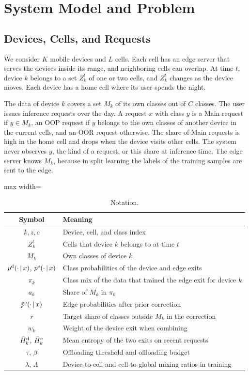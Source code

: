 \section{System Model and Problem}
\label{sec:system}

\subsection{Devices, Cells, and Requests}

We consider $K$ mobile devices and $L$ cells. Each cell has an edge server that serves the devices inside its range, and neighboring cells can overlap. At time $t$, device $k$ belongs to a set $Z_k^t$ of one or two cells, and $Z_k^t$ changes as the device moves. Each device has a home cell where its user spends the night.

The data of device $k$ covers a set $M_k$ of its own classes out of $C$ classes. The user issues inference requests over the day. A request $x$ with class $y$ is a Main request if $y\in M_k$, an OOP request if $y$ belongs to the own classes of another device in the current cells, and an OOR request otherwise. The share of Main requests is high in the home cell and drops when the device visits other cells. The system never observes $y$, the kind of a request, or this share at inference time. The edge server knows $M_k$, because in split learning the labels of the training samples are sent to the edge.

\begin{table}[t]
\centering
\caption{Notation.}
\label{tab:notation}
\begin{adjustbox}{max width=\columnwidth}
\begin{tabular}{cl}
\toprule
Symbol & Meaning \\
\midrule
$k, z, c$ & Device, cell, and class index \\
$Z_k^t$ & Cells that device $k$ belongs to at time $t$ \\
$M_k$ & Own classes of device $k$ \\
$p^{\mathrm{d}}(\cdot\,|\,x)$, $p^{\mathrm{e}}(\cdot\,|\,x)$ & Class probabilities of the device and edge exits \\
$\pi_k$ & Class mix of the data that trained the edge exit for device $k$ \\
$a_k$ & Share of $M_k$ in $\pi_k$ \\
$\tilde p^{\mathrm{e}}(\cdot\,|\,x)$ & Edge probabilities after prior correction \\
$r$ & Target share of classes outside $M_k$ in the correction \\
$w_k$ & Weight of the device exit when combining \\
$\bar H^{\mathrm{d}}_k$, $\bar H^{\mathrm{e}}_k$ & Mean entropy of the two exits on recent requests \\
$\tau$, $\beta$ & Offloading threshold and offloading budget \\
$\lambda$, $\Lambda$ & Device-to-cell and cell-to-global mixing ratios in training \\
\bottomrule
\end{tabular}
\end{adjustbox}
\end{table}

